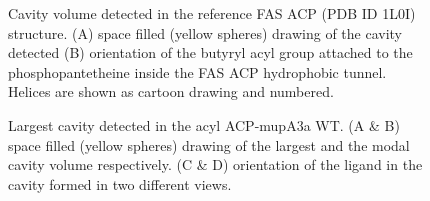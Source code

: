 		\setlength\fboxsep{5pt}
		\setlength\fboxrule{1.5pt}
		\begin{figure}[htbp]
		\centering
		\caption[Cavity volume detected in the reference FAS ACP (PDB ID 1L0I) structure.]{Cavity volume detected in the reference FAS ACP (PDB ID 1L0I) structure. (A) space filled (yellow spheres) drawing of the cavity detected (B) orientation of the butyryl acyl group attached to the phosphopantetheine inside the FAS ACP hydrophobic tunnel. Helices are shown as cartoon drawing and numbered.}
		\label{fig:fas_cavity}
		\end{figure}	
		
		\setlength\fboxsep{5pt}
		\setlength\fboxrule{1.5pt}
		\begin{figure}[htbp]
		\centering
		\caption[Largest cavity detected in the acyl ACP-mupA3a WT.]{Largest cavity detected in the acyl ACP-mupA3a WT. (A \& B) space filled (yellow spheres) drawing of the largest and the modal cavity volume respectively. (C \& D) orientation of the ligand in the cavity formed in two different views.}
		\label{fig:spm_cavities}
		\end{figure}

